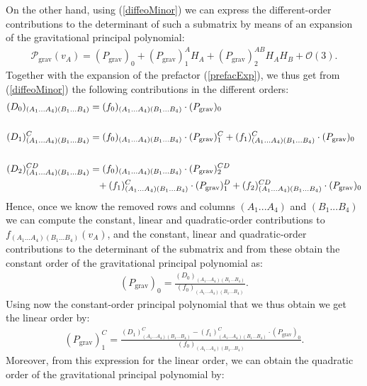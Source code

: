On the other hand, using (\ref{diffeoMinor}) we can express the different-order contributions to the determinant of such a submatrix by means of an expansion of the gravitational principal polynomial:
\begin{align}
    \mathcal{P}_{\text{grav}}(v_A) = (P_{\text{grav}})_{0} + (P_{\text{grav}})^A_1 H_A+ (P_{\text{grav}})^{AB}_2 H_A H_B +\mathcal{O}(3).
\end{align}
Together with the expansion of the prefactor (\ref{prefacExp}), we thus get from (\ref{diffeoMinor}) the following contributions in the different orders:
\begin{align}\label{minorPoly}
    \begin{aligned}
    (D_0)_{(A_1...A_4)(B_1...B_4)}  &= (f_0)_{(A_1...A_4)(B_1...B_4)} \cdot (P_{\text{grav}})_0 \\
    \\
    (D_1)^C_{(A_1...A_4)(B_1...B_4)}  &= (f_0)_{(A_1...A_4)(B_1...B_4)} \cdot (P_{\text{grav}})^C_1 + (f_1)^C_{(A_1...A_4)(B_1...B_4)} \cdot (P_{\text{grav}})_0  \\
    \\
    (D_2)^{CD}_{(A_1...A_4)(B_1...B_4)}  &=  (f_0)_{(A_1...A_4)(B_1...B_4)} \cdot (P_{\text{grav}})_2^{CD} \\
     & \hphantom{=} +
     (f_1)^C_{(A_1...A_4)(B_1...B_4)} \cdot (P_{\text{grav}})_1^D +(f_2)^{CD}_{(A_1...A_4)(B_1...B_4)} \cdot (P_{\text{grav}})_0 
    \end{aligned}
\end{align}
Hence, once we know the removed rows and columns $(A_1...A_4)$ and $(B_1...B_4)$ we can compute the constant, linear and quadratic-order contributions to $f_{(A_1...A_4)(B_1...B_4)}(v_A)$, and the constant, linear and quadratic-order contributions to the determinant of the submatrix and from these obtain the constant order of the gravitational principal polynomial as:
\begin{align}\label{POLY1}
(P_{\text{grav}})_0 = \frac{(D_0)_{(A_1...A_4)(B_1...B_4)}}{(f_0)_{(A_1...A_4)(B_1...B_4)}}.
\end{align}
Using now the constant-order principal polynomial that we thus obtain we get the linear order by:
\begin{align}\label{POLY2}
    (P_{\text{grav}})^C_1= \frac{(D_1)^C_{(A_1...A_4)(B_1...B_4)} - (f_1)^C_{(A_1...A_4)(B_1...B_4)} \cdot (P_{\text{grav}})_0}{(f_0)_{(A_1...A_4)(B_1...B_4)}}.
\end{align}
Moreover, from this expression for the linear order, we can obtain the quadratic order of the gravitational principal polynomial by:
